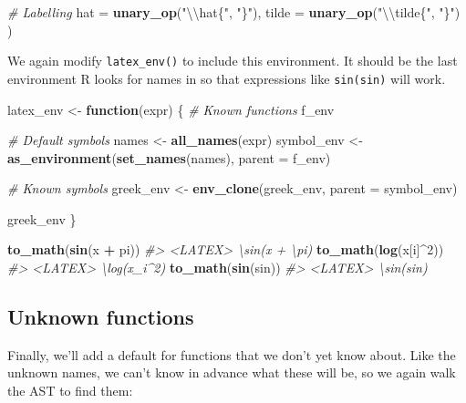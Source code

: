 \documentclass[]{book}
\newenvironment{Shaded}{\begin{snugshade}}{\end{snugshade}}
\newcommand{\CharTok}[1]{\textcolor[rgb]{0.5,0.5,0.5}{#1}}
\newcommand{\CommentTok}[1]{\textcolor[rgb]{0.37,0.37,0.37}{\textit{#1}}}
\newcommand{\ControlFlowTok}[1]{\textcolor[rgb]{0.27,0.27,0.27}{\textbf{#1}}}
\newcommand{\DataTypeTok}[1]{\textcolor[rgb]{0.27,0.27,0.27}{#1}}
\newcommand{\DecValTok}[1]{\textcolor[rgb]{0.06,0.06,0.06}{#1}}
\newcommand{\KeywordTok}[1]{\textcolor[rgb]{0.27,0.27,0.27}{\textbf{#1}}}
\newcommand{\NormalTok}[1]{#1}
\newcommand{\OperatorTok}[1]{\textcolor[rgb]{0.43,0.43,0.43}{\textbf{#1}}}
\newcommand{\StringTok}[1]{\textcolor[rgb]{0.5,0.5,0.5}{#1}}
\begin{document}
\begin{Shaded}
\begin{Highlighting}[]
  \CommentTok{# Labelling}
  \DataTypeTok{hat =}   \KeywordTok{unary_op}\NormalTok{(}\StringTok{"}\CharTok{\textbackslash{}\textbackslash{}}\StringTok{hat\{"}\NormalTok{, }\StringTok{"\}"}\NormalTok{),}
  \DataTypeTok{tilde =} \KeywordTok{unary_op}\NormalTok{(}\StringTok{"}\CharTok{\textbackslash{}\textbackslash{}}\StringTok{tilde\{"}\NormalTok{, }\StringTok{"\}"}\NormalTok{)}
\NormalTok{)}
\end{Highlighting}
\end{Shaded}

We again modify \texttt{latex\_env()} to include this environment. It should be the last environment R looks for names in so that expressions like \texttt{sin(sin)} will work.

\begin{Shaded}
\begin{Highlighting}[]
\NormalTok{latex_env <-}\StringTok{ }\ControlFlowTok{function}\NormalTok{(expr) \{}
  \CommentTok{# Known functions}
\NormalTok{  f_env}

  \CommentTok{# Default symbols}
\NormalTok{  names <-}\StringTok{ }\KeywordTok{all_names}\NormalTok{(expr)}
\NormalTok{  symbol_env <-}\StringTok{ }\KeywordTok{as_environment}\NormalTok{(}\KeywordTok{set_names}\NormalTok{(names), }\DataTypeTok{parent =}\NormalTok{ f_env)}

  \CommentTok{# Known symbols}
\NormalTok{  greek_env <-}\StringTok{ }\KeywordTok{env_clone}\NormalTok{(greek_env, }\DataTypeTok{parent =}\NormalTok{ symbol_env)}

\NormalTok{  greek_env}
\NormalTok{\}}

\KeywordTok{to_math}\NormalTok{(}\KeywordTok{sin}\NormalTok{(x }\OperatorTok{+}\StringTok{ }\NormalTok{pi))}
\CommentTok{#> <LATEX> \textbackslash{}sin(x + \textbackslash{}pi)}
\KeywordTok{to_math}\NormalTok{(}\KeywordTok{log}\NormalTok{(x[i]}\OperatorTok{^}\DecValTok{2}\NormalTok{))}
\CommentTok{#> <LATEX> \textbackslash{}log(x_i^2)}
\KeywordTok{to_math}\NormalTok{(}\KeywordTok{sin}\NormalTok{(sin))}
\CommentTok{#> <LATEX> \textbackslash{}sin(sin)}
\end{Highlighting}
\end{Shaded}

\hypertarget{unknown-functions}{%
\subsection{Unknown functions}\label{unknown-functions}}

Finally, we'll add a default for functions that we don't yet know about. Like the unknown names, we can't know in advance what these will be, so we again walk the AST to find them:
\end{document}
